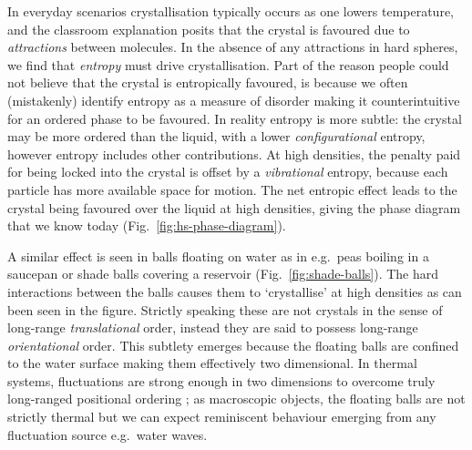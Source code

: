 \documentclass[11pt,twoside]{report}
\begin{document}
In everyday scenarios crystallisation typically occurs as one lowers temperature, and the classroom explanation posits that the crystal is favoured due to \emph{attractions} between molecules.
In the absence of any attractions in hard spheres, we find that \emph{entropy} must drive crystallisation.
Part of the reason people could not believe that the crystal is entropically favoured, is because we often (mistakenly) identify entropy as a measure of disorder making it counterintuitive for an ordered phase to be favoured.
In reality entropy is more subtle: the crystal may be more ordered than the liquid, with a lower \emph{configurational} entropy, however entropy includes other contributions.
At high densities, the penalty paid for being locked into the crystal is offset by a \emph{vibrational} entropy, because each particle has more available space for motion.
The net entropic effect leads to the crystal being favoured over the liquid at high densities, giving the phase diagram that we know today (Fig.\ \ref{fig:hs-phase-diagram}).

A similar effect is seen in balls floating on water as in e.g.\ peas boiling in a saucepan or shade balls covering a reservoir (Fig.\ \ref{fig:shade-balls}).
The hard interactions between the balls causes%
them to `crystallise' at high densities as can been seen in the figure.
Strictly speaking these are not crystals in the sense of long-range \emph{translational} order, instead they are said to possess long-range \emph{orientational} order.
This subtlety emerges because the floating balls are confined to the water surface making them effectively two dimensional.
In thermal systems, fluctuations are strong enough in two dimensions to overcome truly long-ranged positional ordering \cite{MerminPRL1966,MerminPR1968}; as macroscopic objects, the floating balls are not strictly thermal but we can expect reminiscent behaviour emerging from any fluctuation source e.g.\ water waves.
\end{document}
